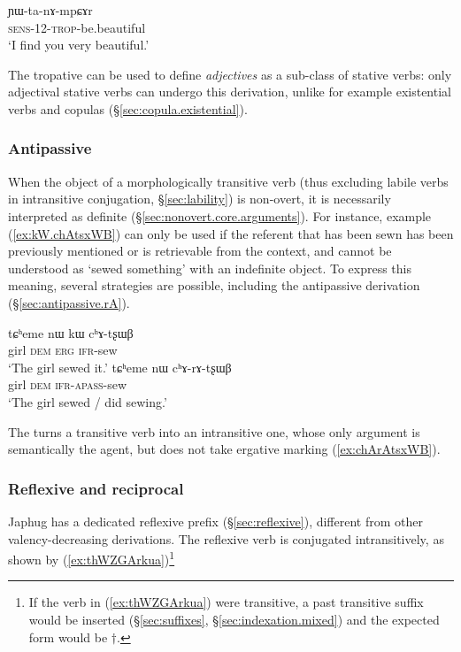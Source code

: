 \begin{exe}
\ex  \label{ex:YWtanAmpCAr}
\gll ɲɯ-ta-nɤ-mpɕɤr \\
\textsc{sens}-1\fl{}2-\textsc{trop}-be.beautiful \\
\glt `I find you very beautiful.' 
\end{exe}

The tropative can be used to define \textit{adjectives} as a sub-class of stative verbs: only adjectival stative verbs can undergo this derivation, unlike for example existential verbs and copulas (§\ref{sec:copula.existential}).

\subsubsection{Antipassive}
When the object of a morphologically transitive verb (thus excluding labile verbs in intransitive conjugation, §\ref{sec:lability}) is non-overt, it is necessarily interpreted as definite (§\ref{sec:nonovert.core.arguments}). For instance, example (\ref{ex:kW.chAtsxWB}) can only be used if the referent that has been sewn has been previously mentioned or is retrievable from the context, and cannot be understood as `sewed something' with an indefinite object. To express this meaning, several strategies are possible, including the antipassive  derivation (§\ref{sec:antipassive.rA}). 

\begin{exe}
\ex 
\begin{xlist}
\ex \label{ex:kW.chAtsxWB}
\gll tɕʰeme nɯ kɯ cʰɤ-tʂɯβ \\
girl \textsc{dem} \textsc{erg}  \textsc{ifr}-sew \\
\glt `The girl sewed it.' 
\ex \label{ex:chArAtsxWB}
\gll  tɕʰeme nɯ cʰɤ-rɤ-tʂɯβ \\
 girl \textsc{dem}  \textsc{ifr}-\textsc{apass}-sew \\
 \glt `The girl sewed / did sewing.' 
 \end{xlist}
  \end{exe}
The  turns a transitive verb into an intransitive one, whose only argument is semantically the agent, but does not take ergative marking  (\ref{ex:chArAtsxWB}).

\subsubsection{Reflexive and reciprocal}
Japhug has a dedicated reflexive prefix  (§\ref{sec:reflexive}), different from other valency-decreasing derivations. The reflexive verb is conjugated intransitively, as shown by (\ref{ex:thWZGArkua})\footnote{If the verb in (\ref{ex:thWZGArkua}) were transitive, a past transitive  suffix would be inserted (§\ref  {sec:suffixes}, §\ref{sec:indexation.mixed}) and the expected form would be $\dagger$. }
 

